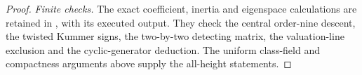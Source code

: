 \begin{proof}
\emph{Finite checks.}
The exact coefficient, inertia and eigenspace calculations are
retained in ,
with its executed output.  They check the central order-nine
descent, the twisted Kummer signs, the two-by-two detecting matrix,
the valuation-line exclusion and the cyclic-generator deduction.
The uniform class-field and compactness arguments above supply
the all-height statements.
\end{proof}
